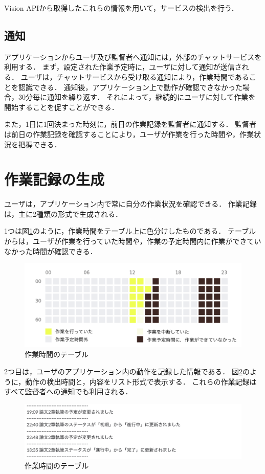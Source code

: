 Vision APIから取得したこれらの情報を用いて，サービスの検出を行う．

\subsection{通知}
アプリケーションからユーザ及び監督者へ通知には，外部のチャットサービスを利用する．
まず，設定された作業予定時に，ユーザに対して通知が送信される．
ユーザは，チャットサービスから受け取る通知により，作業時間であることを認識できる．
通知後，アプリケーション上で動作が確認できなかった場合，30分毎に通知を繰り返す．
それによって，継続的にユーザに対して作業を開始することを促すことができる．

また，1日に1回決まった時刻に，前日の作業記録を監督者に通知する．
監督者は前日の作業記録を確認することにより，ユーザが作業を行った時間や，作業状況を把握できる．

\clearpage

\section{作業記録の生成}
ユーザは，アプリケーション内で常に自分の作業状況を確認できる．
作業記録は，主に2種類の形式で生成される．

1つは図\ref{fig:activity_table}のように，作業時間をテーブル上に色分けしたものである．
テーブルからは，ユーザが作業を行っていた時間や，作業の予定時間内に作業ができていなかった時間が確認できる．

\begin{figure}[h]
  \begin{center}
  \includegraphics[width=12.0cm]{graphics/activity_table.png}
  \caption{作業時間のテーブル}
  \label{fig:activity_table}
  \end{center}
\end{figure}

\clearpage

2つ目は，ユーザのアプリケーション内の動作を記録した情報である．
図\ref{fig:activity_log}のように，動作の検出時間と，内容をリスト形式で表示する．
これらの作業記録はすべて監督者への通知でも利用される．

\begin{figure}[h]
  \begin{center}
  \includegraphics[width=14.0cm]{graphics/activity_log.png}
  \caption{作業時間のテーブル}
  \label{fig:activity_log}
  \end{center}
\end{figure}
